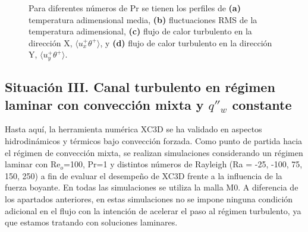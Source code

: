 \begin{figure}[H]
 \caption{Para diferentes números de Pr se tienen los perfiles de \textbf{(a)} temperatura adimensional media, \textbf{(b)} fluctuaciones RMS de la temperatura adimensional, \textbf{(c)} flujo de calor turbulento en la dirección X, $\langle u^+_x \theta^+ \rangle$, y \textbf{(d)} flujo de calor turbulento en la dirección Y, $\langle u^+_y \theta^+ \rangle$.} 
 \label{fig:kpr_1}
\end{figure}


\subsection{Situación III. Canal turbulento en régimen laminar con convección mixta y $q''_w$ constante} \label{sec:mix-laminar}

Hasta aquí, la herramienta numérica XC3D se ha validado en aspectos hidrodinámicos y térmicos bajo convección forzada. Como punto de partida hacia el régimen de convección mixta, se realizan simulaciones considerando un régimen laminar con Re$_o$=100, Pr=1 y distintos números de Rayleigh (Ra = -25, -100, 75, 150, 250) a fin de evaluar el desempeño de XC3D frente a la influencia de la fuerza boyante. En todas las simulaciones se utiliza la malla M0. A diferencia de los apartados anteriores, en estas simulaciones no se impone ninguna condición adicional en el flujo con la intención de acelerar el paso al régimen turbulento, ya que estamos tratando con soluciones laminares.

